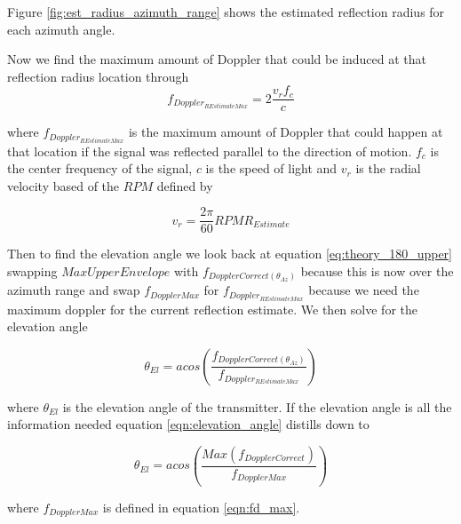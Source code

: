 Figure \ref{fig:est_radius_azimuth_range} shows the estimated reflection radius for each azimuth angle.

Now we find the maximum amount of Doppler that could be induced at that reflection radius location through
\begin{equation}
	f_{Doppler_{R Estimate Max}} = 2\frac{v_r f_c}{c}
	\label{eqn:max_doppler}
\end{equation}

where $f_{Doppler_{R Estimate Max}}$ is the maximum amount of Doppler that could happen at that location if the signal was reflected parallel to the direction of motion. $f_c$ is the center frequency of the signal, $c$ is the speed of light and $v_r$ is the radial velocity based of the $RPM$ defined by

\begin{equation}
	v_r = \frac{2\pi}{60} RPM R_{Estimate}
	\label{eqn:v_radial}
\end{equation}

Then to find the elevation angle we look back at equation \ref{eq:theory_180_upper} swapping $MaxUpperEnvelope$ with $f_{DopplerCorrect(\theta_{Az})}$ because this is now over the azimuth range and swap $f_{DopplerMax}$ for $f_{Doppler_{R Estimate Max}}$ because we need the maximum doppler for the current reflection estimate. We then solve for the elevation angle

\begin{equation}
	\theta_{El} = acos\left(\frac{f_{DopplerCorrect(\theta_{Az})}}{f_{Doppler_{R Estimate Max}}}\right)
	\label{eqn:elevation_angle}
\end{equation}

where $\theta_{El}$ is the elevation angle of the transmitter. If the elevation angle is all the information needed equation \ref{eqn:elevation_angle} distills down to

\begin{equation}
	\theta_{El} = acos\left(\frac{Max(f_{DopplerCorrect})}{f_{DopplerMax}}\right)
	\label{eqn:elevation_angle_only}
\end{equation}

where $f_{DopplerMax}$ is defined in equation \ref{eqn:fd_max}.

